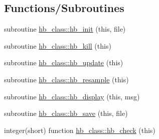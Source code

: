 \subsection*{Functions/\+Subroutines}
\begin{DoxyCompactItemize}
\item 
subroutine \hyperlink{namespacehb__class_aad89f206670f2c2396f92abf66cf9c1d}{hb\+\_\+class\+::hb\+\_\+init} (this, file)
\item 
subroutine \hyperlink{namespacehb__class_a696c9e145feab6ab780338ffcf6d6d4b}{hb\+\_\+class\+::hb\+\_\+kill} (this)
\item 
subroutine \hyperlink{namespacehb__class_a03d6e94665987e6ce2a283953632fb3f}{hb\+\_\+class\+::hb\+\_\+update} (this)
\item 
subroutine \hyperlink{namespacehb__class_a9d6faaa888c003d629e1b35f8b510832}{hb\+\_\+class\+::hb\+\_\+resample} (this)
\item 
subroutine \hyperlink{namespacehb__class_a8d8a7109913e9189fbc950d34378727b}{hb\+\_\+class\+::hb\+\_\+display} (this, msg)
\item 
subroutine \hyperlink{namespacehb__class_a53b39344e155580d8d2161a497774364}{hb\+\_\+class\+::hb\+\_\+save} (this, file)
\item 
integer(short) function \hyperlink{namespacehb__class_a84c1c4284b5897ff912c8c1671b6775f}{hb\+\_\+class\+::hb\+\_\+check} (this)
\end{DoxyCompactItemize}
